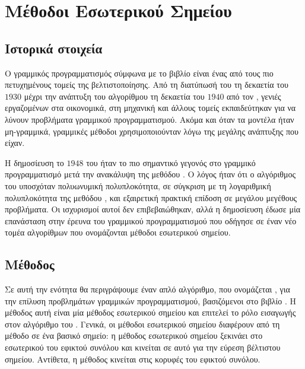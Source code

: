\chapter{Μέθοδοι Εσωτερικού Σημείου}\label{ch:ip}
\section{Ιστορικά στοιχεία}
Ο γραμμικός προγραμματισμός σύμφωνα με το βιβλίο \cite{wright1997primal}
είναι ένας από τους πιο πετυχημένους τομείς της
βελτιστοποίησης. Από τη διατύπωσή του τη δεκαετία του \(1930\) μέχρι την
ανάπτυξη του αλγορίθμου  τη δεκαετία του \(1940\) από τον
, γενιές εργαζομένων στα οικονομικά, στη μηχανική και άλλους τομείς
εκπαιδεύτηκαν για να λύνουν προβλήματα γραμμικού προγραμματισμού. Ακόμα και όταν
τα μοντέλα ήταν μη-γραμμικά, γραμμικές μέθοδοι χρησιμοποιούνταν λόγω της μεγάλης
ανάπτυξης που είχαν.

Η δημοσίευση το \(1948\) του  \cite{karmarkar1984} ήταν το πιο σημαντικό γεγονός στο
γραμμικό προγραμματισμό μετά την ανακάλυψη της μεθόδου . Ο λόγος
ήταν ότι ο αλγόριθμος του  υποσχόταν πολυωνυμική πολυπλοκότητα, σε
σύγκριση με τη λογαριθμική πολυπλοκότητα της μεθόδου , και
εξαιρετική πρακτική επίδοση σε μεγάλου μεγέθους προβλήματα. Οι ισχυρισμοί αυτοί
δεν επιβεβαιώθηκαν, αλλά η δημοσίευση έδωσε μία επανάσταση στην έρευνα του
γραμμικού προγραμματισμού που οδήγησε σε έναν νέο τομέα αλγορίθμων που
ονομάζονται μέθοδοι εσωτερικού σημείου.

\section{Μέθοδος }
Σε αυτή την ενότητα θα περιγράψουμε έναν απλό αλγόριθμο, που ονομάζεται
, για την επίλυση προβλημάτων γραμμικών προγραμματισμού,
βασιζόμενοι στο βιβλίο \cite{chong2010}. Η μέθοδος αυτή είναι μία μέθοδος
εσωτερικού σημείου και επιτελεί το ρόλο εισαγωγής στον αλγόριθμο του
. Γενικά, οι μέθοδοι εσωτερικού σημείου διαφέρουν από τη μέθοδο
 σε ένα βασικό σημείο: η μέθοδος εσωτερικού σημείου ξεκινάει στο
εσωτερικού του εφικτού συνόλου και κινείται σε αυτό για την εύρεση βέλτιστου
σημείου. Αντίθετα, η μέθοδος  κινείται στις κορυφές του εφικτού
συνόλου.

